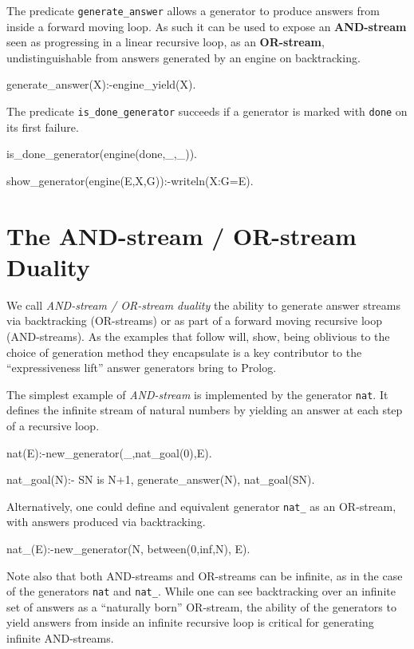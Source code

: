 \documentclass{new_tlp}
\begin{document}
The predicate {\tt generate\_answer} allows a generator to produce answers from inside a forward moving loop. As such it can be used to expose an {\bf AND-stream} seen as progressing  in a linear recursive loop, as an {\bf OR-stream}, undistinguishable from answers generated by an engine on backtracking.
\begin{code}
generate_answer(X):-engine_yield(X).
\end{code}
The predicate {\tt is\_done\_generator} succeeds if a generator is marked with {\tt done} on its first failure.

\begin{code}
is_done_generator(engine(done,_,_)).
\end{code}

\begin{codeh}
show_generator(engine(E,X,G)):-writeln(X:G=E).
\end{codeh}

\section{The AND-stream / OR-stream Duality}

We call {\em AND-stream / OR-stream duality} the
ability to generate answer streams via backtracking (OR-streams) or
as part of a forward moving recursive loop (AND-streams).
As the examples that follow will, show,
being oblivious to the choice of generation method they encapsulate
is a key contributor to the ``expressiveness lift'' answer generators
bring to Prolog.

The simplest example of {\em AND-stream} is  implemented
by the generator {\tt nat}. It defines the infinite stream of natural numbers 
by yielding an answer at each step of a recursive loop.
\begin{code}
nat(E):-new_generator(_,nat_goal(0),E).

nat_goal(N):-
  SN is N+1,
  generate_answer(N),
  nat_goal(SN).
\end{code}

Alternatively, one could define 
and equivalent generator {\tt nat\_} as an OR-stream,  with answers 
produced via  backtracking.

\begin{code}
nat_(E):-new_generator(N, between(0,inf,N), E).
\end{code}

Note also that both AND-streams and OR-streams can be infinite, as in the
case of the generators {\tt nat} and {\tt nat\_}.
While one can see backtracking over an infinite set of answers as
a ``naturally born'' OR-stream, the ability of the generators to
yield answers from inside an infinite recursive loop is critical
for generating infinite AND-streams.
\end{document}
